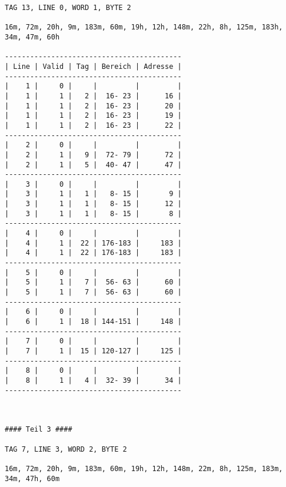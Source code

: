 \documentclass[10pt,a4paper]{article}
\begin{document}
\begin{lstlisting}
TAG 13, LINE 0, WORD 1, BYTE 2

16m, 72m, 20h, 9m, 183m, 60m, 19h, 12h, 148m, 22h, 8h, 125m, 183h, 34m, 47m, 60h

------------------------------------------
| Line | Valid | Tag | Bereich | Adresse |
------------------------------------------
|    1 |     0 |     |         |         |
|    1 |     1 |   2 |  16- 23 |      16 |
|    1 |     1 |   2 |  16- 23 |      20 |
|    1 |     1 |   2 |  16- 23 |      19 |
|    1 |     1 |   2 |  16- 23 |      22 |
------------------------------------------
|    2 |     0 |     |         |         |
|    2 |     1 |   9 |  72- 79 |      72 |
|    2 |     1 |   5 |  40- 47 |      47 |
------------------------------------------
|    3 |     0 |     |         |         |
|    3 |     1 |   1 |   8- 15 |       9 |
|    3 |     1 |   1 |   8- 15 |      12 |
|    3 |     1 |   1 |   8- 15 |       8 |
------------------------------------------
|    4 |     0 |     |         |         |
|    4 |     1 |  22 | 176-183 |     183 |
|    4 |     1 |  22 | 176-183 |     183 |
------------------------------------------
|    5 |     0 |     |         |         |
|    5 |     1 |   7 |  56- 63 |      60 |
|    5 |     1 |   7 |  56- 63 |      60 |
------------------------------------------
|    6 |     0 |     |         |         |
|    6 |     1 |  18 | 144-151 |     148 |
------------------------------------------
|    7 |     0 |     |         |         |
|    7 |     1 |  15 | 120-127 |     125 |
------------------------------------------
|    8 |     0 |     |         |         |
|    8 |     1 |   4 |  32- 39 |      34 |
------------------------------------------



#### Teil 3 ####

TAG 7, LINE 3, WORD 2, BYTE 2

16m, 72m, 20h, 9m, 183m, 60m, 19h, 12h, 148m, 22m, 8h, 125m, 183m, 34m, 47h, 60m


\end{lstlisting}
\end{document}
